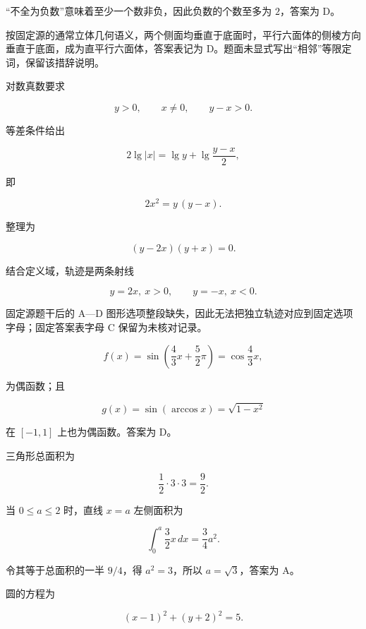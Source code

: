 \begin{answer}
“不全为负数”意味着至少一个数非负，因此负数的个数至多为 $2$，答案为 D。


按固定源的通常立体几何语义，两个侧面均垂直于底面时，平行六面体的侧棱方向垂直于底面，成为直平行六面体，答案表记为 D。题面未显式写出“相邻”等限定词，保留该措辞说明。


对数真数要求

\nopagebreak[4]
\[
y>0,\qquad x\ne0,\qquad y-x>0.
\]

等差条件给出

\nopagebreak[4]
\[
2\lg|x|=\lg y+\lg\frac{y-x}{2},
\]

即

\nopagebreak[4]
\[
2x^2=y\,(y-x).
\]

整理为

\nopagebreak[4]
\[
(y-2x)(y+x)=0.
\]

结合定义域，轨迹是两条射线

\nopagebreak[4]
\[
y=2x,\ x>0,
\qquad
y=-x,\ x<0.
\]

固定源题干后的 A—D 图形选项整段缺失，因此无法把独立轨迹对应到固定选项字母；固定答案表字母 C 保留为未核对记录。


\nopagebreak[4]
\[
f(x)=\sin\left(\frac43x+\frac52\pi\right)
=\cos\frac43x,
\]

为偶函数；且

\nopagebreak[4]
\[
g(x)=\sin(\arccos x)=\sqrt{1-x^2}
\]

在 $[-1,1]$ 上也为偶函数。答案为 D。


三角形总面积为

\nopagebreak[4]
\[
\frac12\cdot3\cdot3=\frac92.
\]

当 $0\le a\le2$ 时，直线 $x=a$ 左侧面积为

\nopagebreak[4]
\[
\int_0^a\frac32x\,dx=\frac34a^2.
\]

令其等于总面积的一半 $9/4$，得 $a^2=3$，所以 $a=\sqrt3$，答案为 A。


圆的方程为

\nopagebreak[4]
\[
(x-1)^2+(y+2)^2=5.
\]


\end{answer}
